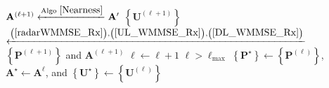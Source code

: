 \documentclass[9pt,journal]{IEEEtran}
\newcommand{\paren}[1]{\left({#1}\right)}
\newcommand{\braces}[1]{{\left\{ {#1}\right\}}}
\theoremstyle{definition}
\begin{document}
\begin{algorithm}[ht!]
\begin{algorithmic}[1]
			\State $\mathbf{A}^{\paren{\mathrm{\ell+1}}}\xleftarrow{\textrm{Algo }\ref{Nearness}}\mathbf{A}^\prime$  %
			\State $\braces{\mathbf{U}^{\paren{\mathrm{\ell+1}}}}$ $\xleftarrow{\mathrm{\paren{\ref{radarWMMSE_Rx}}},\mathrm{\paren{\ref{UL_WMMSE_Rx}}},\mathrm{\paren{\ref{DL_WMMSE_Rx}}}}$  $\braces{\mathbf{P}^{\paren{\mathrm{\ell+1}}}}$ and $\mathbf{A}^{\paren{\mathrm{\ell+1}}}$ 
			\State $\mathrm{\ell}\leftarrow\mathrm{\ell}+1$
			\Until $\mathrm{\ell}>\mathrm{\ell}_{\textrm{max}}$
			\State $\braces{\mathbf{P}^\star}\leftarrow\braces{\mathbf{P}^{\paren{\mathrm{\ell}}}}$, $\mathbf{A}^\star\leftarrow\mathbf{A}^{\mathrm{\ell}}$, and $\braces{\mathbf{U}^\star}\leftarrow\braces{\mathbf{U}^{\paren{\mathrm{\ell}}}}$
			\State \Return{$\braces{\mathbf{P}^\star},\mathbf{A}^\star,\braces{\mathbf{U}^\star}$}
		\end{algorithmic}
	\end{algorithm}\normalsize
\vspace{-1em}
\end{document}
